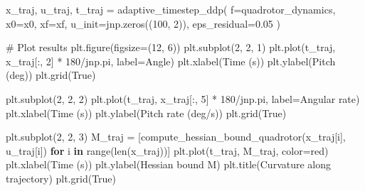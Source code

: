 \documentclass[
  letterpaper,
  DIV=11,
  numbers=noendperiod]{scrartcl}
\newenvironment{Shaded}{\begin{snugshade}}{\end{snugshade}}
\newcommand{\BuiltInTok}[1]{\textcolor[rgb]{0.00,0.23,0.31}{#1}}
\newcommand{\CommentTok}[1]{\textcolor[rgb]{0.37,0.37,0.37}{#1}}
\newcommand{\ControlFlowTok}[1]{\textcolor[rgb]{0.00,0.23,0.31}{\textbf{#1}}}
\newcommand{\DecValTok}[1]{\textcolor[rgb]{0.68,0.00,0.00}{#1}}
\newcommand{\FloatTok}[1]{\textcolor[rgb]{0.68,0.00,0.00}{#1}}
\newcommand{\KeywordTok}[1]{\textcolor[rgb]{0.00,0.23,0.31}{\textbf{#1}}}
\newcommand{\NormalTok}[1]{\textcolor[rgb]{0.00,0.23,0.31}{#1}}
\newcommand{\OperatorTok}[1]{\textcolor[rgb]{0.37,0.37,0.37}{#1}}
\newcommand{\StringTok}[1]{\textcolor[rgb]{0.13,0.47,0.30}{#1}}
\newcommand{\VariableTok}[1]{\textcolor[rgb]{0.07,0.07,0.07}{#1}}
\begin{document}
\begin{Shaded}
\begin{Highlighting}[]
\NormalTok{x\_traj, u\_traj, t\_traj }\OperatorTok{=}\NormalTok{ adaptive\_timestep\_ddp(}
\NormalTok{    f}\OperatorTok{=}\NormalTok{quadrotor\_dynamics,}
\NormalTok{    x0}\OperatorTok{=}\NormalTok{x0,}
\NormalTok{    xf}\OperatorTok{=}\NormalTok{xf,}
\NormalTok{    u\_init}\OperatorTok{=}\NormalTok{jnp.zeros((}\DecValTok{100}\NormalTok{, }\DecValTok{2}\NormalTok{)),}
\NormalTok{    eps\_residual}\OperatorTok{=}\FloatTok{0.05}
\NormalTok{)}

\CommentTok{\# Plot results}
\NormalTok{plt.figure(figsize}\OperatorTok{=}\NormalTok{(}\DecValTok{12}\NormalTok{, }\DecValTok{6}\NormalTok{))}
\NormalTok{plt.subplot(}\DecValTok{2}\NormalTok{, }\DecValTok{2}\NormalTok{, }\DecValTok{1}\NormalTok{)}
\NormalTok{plt.plot(t\_traj, x\_traj[:, }\DecValTok{2}\NormalTok{] }\OperatorTok{*} \DecValTok{180}\OperatorTok{/}\NormalTok{jnp.pi, label}\OperatorTok{=}\StringTok{\textquotesingle{}Angle\textquotesingle{}}\NormalTok{)}
\NormalTok{plt.xlabel(}\StringTok{\textquotesingle{}Time (s)\textquotesingle{}}\NormalTok{)}
\NormalTok{plt.ylabel(}\StringTok{\textquotesingle{}Pitch (deg)\textquotesingle{}}\NormalTok{)}
\NormalTok{plt.grid(}\VariableTok{True}\NormalTok{)}

\NormalTok{plt.subplot(}\DecValTok{2}\NormalTok{, }\DecValTok{2}\NormalTok{, }\DecValTok{2}\NormalTok{)}
\NormalTok{plt.plot(t\_traj, x\_traj[:, }\DecValTok{5}\NormalTok{] }\OperatorTok{*} \DecValTok{180}\OperatorTok{/}\NormalTok{jnp.pi, label}\OperatorTok{=}\StringTok{\textquotesingle{}Angular rate\textquotesingle{}}\NormalTok{)}
\NormalTok{plt.xlabel(}\StringTok{\textquotesingle{}Time (s)\textquotesingle{}}\NormalTok{)}
\NormalTok{plt.ylabel(}\StringTok{\textquotesingle{}Pitch rate (deg/s)\textquotesingle{}}\NormalTok{)}
\NormalTok{plt.grid(}\VariableTok{True}\NormalTok{)}

\NormalTok{plt.subplot(}\DecValTok{2}\NormalTok{, }\DecValTok{2}\NormalTok{, }\DecValTok{3}\NormalTok{)}
\NormalTok{M\_traj }\OperatorTok{=}\NormalTok{ [compute\_hessian\_bound\_quadrotor(x\_traj[i], u\_traj[i])}
          \ControlFlowTok{for}\NormalTok{ i }\KeywordTok{in} \BuiltInTok{range}\NormalTok{(}\BuiltInTok{len}\NormalTok{(x\_traj))]}
\NormalTok{plt.plot(t\_traj, M\_traj, color}\OperatorTok{=}\StringTok{\textquotesingle{}red\textquotesingle{}}\NormalTok{)}
\NormalTok{plt.xlabel(}\StringTok{\textquotesingle{}Time (s)\textquotesingle{}}\NormalTok{)}
\NormalTok{plt.ylabel(}\StringTok{\textquotesingle{}Hessian bound M\textquotesingle{}}\NormalTok{)}
\NormalTok{plt.title(}\StringTok{\textquotesingle{}Curvature along trajectory\textquotesingle{}}\NormalTok{)}
\NormalTok{plt.grid(}\VariableTok{True}\NormalTok{)}


\end{Highlighting}
\end{Shaded}
\end{document}
